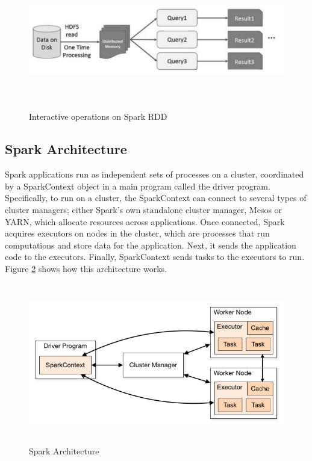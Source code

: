 \begin{itemize}
\begin{figure}[H]
\begin{center}
\includegraphics[width=14cm,height=6cm]{chapter2/fig7.png}
\end{center}
\caption{Interactive operations on Spark RDD}
\label{RDD2}
\end{figure}

\end{itemize}

\subsection{Spark Architecture}

Spark applications run as independent sets of processes on a cluster, coordinated by a SparkContext object in a main program called the driver program. Specifically, to run on a cluster, the SparkContext can connect to several types of cluster managers; either Spark's own standalone cluster manager, Mesos or YARN, which allocate resources across applications. Once connected, Spark acquires executors on nodes in the cluster, which are processes that run computations and store data for the application. Next, it sends the application code to the executors. Finally, SparkContext sends tasks to the executors to run. Figure \ref{driver} shows how this architecture works.\\
\begin{figure}[!ht]
\begin{center}
\includegraphics[width=14cm,height=7cm]{chapter2/fig8.png}
\end{center}
\caption{Spark Architecture}
\label{driver}
\end{figure}

